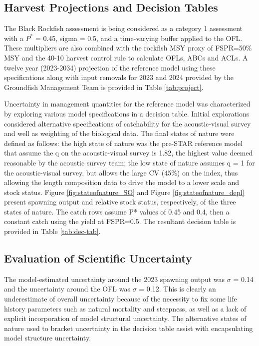 \documentclass[11pt,
  letterpaper,
]{article}
\begin{document}
\hypertarget{harvest-projections-and-decision-tables}{%
\subsection{Harvest Projections and Decision Tables}\label{harvest-projections-and-decision-tables}}

The Black Rockfish assessment is being considered as a category 1 assessment with a \(P^*\) = 0.45, sigma = 0.5, and a time-varying buffer applied to the OFL. These multipliers are also combined with the rockfish MSY proxy of FSPR=50\% MSY and the 40-10 harvest control rule to calculate OFLs, ABCs and ACLs. A twelve year (2023-2034) projection of the reference model using these specifications along with input removals for 2023 and 2024 provided by the Groundfish Management Team is provided in Table \ref{tab:project}.

Uncertainty in management quantities for the reference model was characterized by exploring various model specifications in a decision table. Initial explorations considered alternative specifications of catchability for the acoustic-visual survey and well as weighting of the biological data. The final states of nature were defined as follows: the high state of nature was the pre-STAR reference model that assume the q on the acoustic-visual survey is 1.82, the highest value deemed reasonable by the acoustic survey team; the low state of nature assumes q = 1 for the acoustic-visual survey, but allows the large CV (45\%) on the index, thus allowing the length composition data to drive the model to a lower scale and stock status. Figure \ref{fig:stateofnature_SO} and Figure \ref{fig:stateofnature_depl} present spawning output and relative stock status, respectively, of the three states of nature. The catch rows assume P* values of 0.45 and 0.4, then a constant catch using the yield at FSPR=0.5. The resultant decision table is provided in Table \ref{tab:dec-tab}.

\hypertarget{evaluation-of-scientific-uncertainty}{%
\subsection{Evaluation of Scientific Uncertainty}\label{evaluation-of-scientific-uncertainty}}

The model-estimated uncertainty around the 2023 spawning output was \(\sigma\) = 0.14 and the uncertainty around the OFL was \(\sigma\) = 0.12. This is clearly an underestimate of overall uncertainty because of the necessity to fix some life history parameters such as natural mortality and steepness, as well as a lack of explicit incorporation of model structural uncertainty. The alternative states of nature used to bracket uncertainty in the decision table assist with encapsulating model structure uncertainty.
\end{document}
